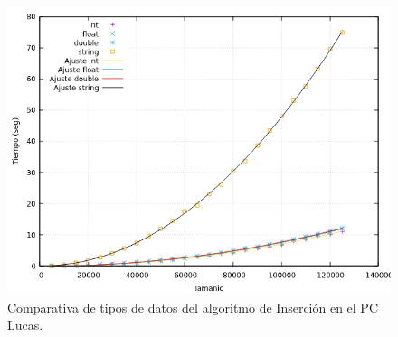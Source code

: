\documentclass[12pt]{article}
\begin{document}
    \begin{figure}
        \centering
        \includegraphics[width=0.8\linewidth]{images/Insercion/Comparacion_total_final.png}
        \caption{Comparativa de tipos de datos del algoritmo de Inserción en el PC Lucas.}
        \label{fig:ComparativaInsercionDatos}
    \end{figure}
    
\end{document}
